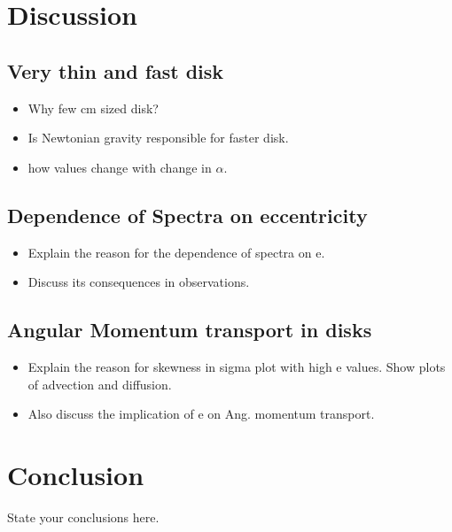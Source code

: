 \documentclass[useAMS,usenatbib]{mn2e}
\begin{document}
\section{Discussion}
\subsection{Very thin and fast disk}
\begin{itemize}
\item Why few cm sized disk?
\item Is Newtonian gravity responsible for faster disk. 
\item how values change with change in $\alpha$. 
\end{itemize}

\subsection{Dependence of Spectra on eccentricity}
\begin{itemize}
\item Explain the reason for the dependence of spectra on e. 
\item Discuss its consequences in observations.
\end{itemize}

\subsection{Angular Momentum transport in disks}
\begin{itemize}
\item Explain the reason for skewness in sigma plot with high e
  values. Show plots of advection and diffusion. 
\item Also discuss the implication of e on Ang. momentum transport. 
\end{itemize}

\section{Conclusion}
State your conclusions here. 






\label{lastpage}
\end{document}
